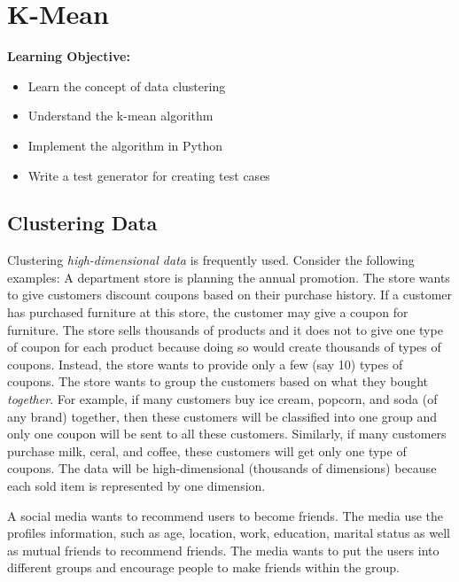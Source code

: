 \chapter{K-Mean}

{\bf Learning Objective:}

\begin{itemize}

\item Learn the concept of data clustering  
  
\item Understand the k-mean algorithm

\item Implement the algorithm in Python

\item Write a test generator for creating test cases
  
\end{itemize}

\section{Clustering Data}

Clustering {\it high-dimensional data} is frequently used. Consider
the following examples:
A department store is planning the annual promotion. The store wants
to give customers discount coupons based on their purchase history.
If a customer has purchased furniture at this store, the customer may
give a coupon for furniture.  The store sells thousands of products
and it does not to give one type of coupon for each product because
doing so would create thousands of types of coupons.  Instead, the
store wants to provide only a few (say 10) types of coupons.  The
store wants to group the customers based on what they bought {\it
  together}.  For example, if many customers buy ice cream, popcorn,
and soda (of any brand) together, then these customers will be
classified into one group and only one coupon will be sent to all
these customers.  Similarly, if many customers purchase milk, ceral,
and coffee, these customers will get only one type of coupons.  The
data will be high-dimensional (thousands of dimensions) because each
sold item is represented by one dimension.

A social media wants to recommend users to become friends.  The media
use the profiles information, such as age, location, work, education,
marital status as well as mutual friends to recommend friends.  The
media wants to put the users into different groups and encourage
people to make friends within the group.

